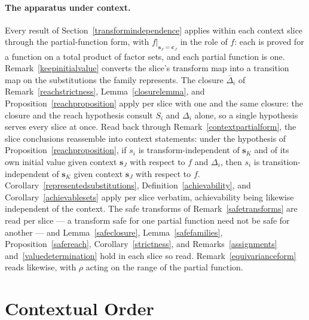 \documentclass{article}
\theoremstyle{definition}
\theoremstyle{remark}
\begin{document}
\paragraph{The apparatus under context.} Every result of Section~\ref{transformindependence} applies within each context slice through the partial-function form, with $f|_{\boldsymbol{s}_J = \boldsymbol{c}_J}$ in the role of $f$: each is proved for a function on a total product of factor sets, and each partial function is one. Remark~\ref{keepinitialvalue} converts the slice's transform map into a transition map on the substitutions the family represents. The closure $\overline{\Delta}_i$ of Remark~\ref{reachstrictness}, Lemma~\ref{closurelemma}, and Proposition~\ref{reachproposition} apply per slice with one and the same closure: the closure and the reach hypothesis consult $S_i$ and $\Delta_i$ alone, so a single hypothesis serves every slice at once. Read back through Remark~\ref{contextpartialform}, the slice conclusions reassemble into context statements: under the hypothesis of Proposition~\ref{reachproposition}, if $s_i$ is transform-independent of $\boldsymbol{s}_K$ and of its own initial value given context $\boldsymbol{s}_J$ with respect to $f$ and $\Delta_i$, then $s_i$ is transition-independent of $\boldsymbol{s}_K$ given context $\boldsymbol{s}_J$ with respect to $f$. Corollary~\ref{representedsubstitutions}, Definition~\ref{achievability}, and Corollary~\ref{achievablesets} apply per slice verbatim, achievability being likewise independent of the context. The safe transforms of Remark~\ref{safetransforms} are read per slice --- a transform safe for one partial function need not be safe for another --- and Lemma~\ref{safeclosure}, Lemma~\ref{safefamilies}, Proposition~\ref{safereach}, Corollary~\ref{strictness}, and Remarks~\ref{assignments} and~\ref{valuedetermination} hold in each slice so read. Remark~\ref{equivarianceform} reads likewise, with $\rho$ acting on the range of the partial function.


\newpage

\section{Contextual Order}
\label{contextualorder}
\end{document}
